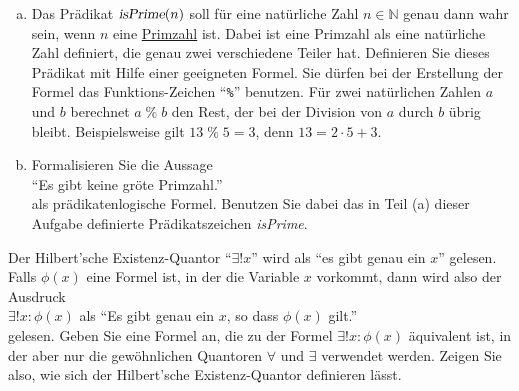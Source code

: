 \exercise
\begin{enumerate}[(a)]
\item Das Pr\"adikat $\textsl{isPrime}(n)$ soll f\"ur eine nat\"urliche Zahl $n \in \mathbb{N}$ genau dann
      wahr sein, wenn $n$ eine \href{https://de.wikipedia.org/wiki/Primzahl}{Primzahl} ist.  
      Dabei ist eine Primzahl als eine nat\"{u}rliche Zahl definiert, die genau zwei verschiedene Teiler hat.
      Definieren Sie dieses Pr\"adikat mit Hilfe einer
      geeigneten Formel.  Sie d\"urfen bei der Erstellung der Formel das Funktions-Zeichen 
      ``\texttt{\%}'' 
      benutzen.  F\"ur zwei nat\"urlichen Zahlen $a$ und $b$ berechnet $a \;\texttt{\%}\; b$ den Rest, der bei der
      Division von $a$ durch $b$ \"ubrig bleibt.  Beispielsweise gilt $13 \;\texttt{\%}\; 5 = 3$, denn
      $13 = 2 \cdot 5 + 3$.
\item Formalisieren Sie die Aussage 
      \\[0.2cm]
      \hspace*{1.3cm}
      ``Es gibt keine gr\"o\3te Primzahl.'' 
      \\[0.2cm]
      als pr\"adikatenlogische Formel.  Benutzen Sie dabei das in Teil (a) dieser Aufgabe definierte
      Pr\"adikatszeichen \textsl{isPrime}.  \eox
\end{enumerate}

\exercise
Der Hilbert'sche Existenz-Quantor ``$\exists!x$'' wird als ``es gibt genau ein $x$'' gelesen.
Falls $\phi(x)$ eine Formel ist, in der die Variable $x$ vorkommt, dann wird also der Ausdruck
\\[0.2cm]
\hspace*{1.3cm}
$\exists! x\!:\!\phi(x)$ \quad als \quad ``Es gibt genau ein $x$, so dass $\phi(x)$ gilt.''
\\[0.2cm]
gelesen.
Geben Sie eine Formel an, die zu der Formel $\exists! x\!:\!\phi(x)$ \"aquivalent ist, in der aber nur die
gew\"ohnlichen Quantoren $\forall$ und $\exists$ verwendet werden.  Zeigen Sie also, wie sich der
Hilbert'sche Existenz-Quantor definieren l\"asst.
\eox

